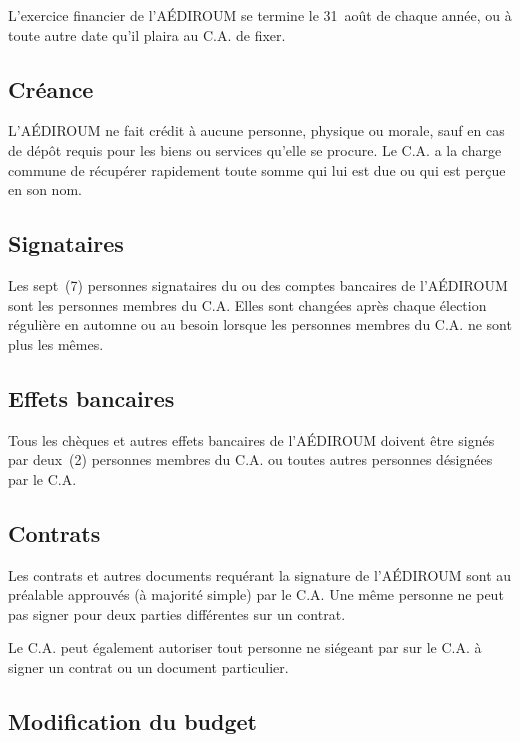 \documentclass{aediroum}
\begin{document}
L'exercice financier de l'AÉDIROUM se termine le 31~août de chaque année, ou à toute autre date qu'il plaira au C.A. de fixer.

\subsection{Créance}\label{sec:creance}

L'AÉDIROUM ne fait crédit à aucune personne, physique ou morale, sauf en cas de dépôt requis pour les biens ou services qu'elle se procure. Le C.A. a la charge commune de récupérer rapidement toute somme qui lui est due ou qui est perçue en son nom.

\subsection{Signataires}\label{sec:signataires}
Les sept~(7) personnes signataires du ou des comptes bancaires de l'AÉDIROUM sont les personnes membres du C.A. Elles sont changées après chaque élection régulière en automne ou au besoin lorsque les personnes membres du C.A. ne sont plus les mêmes.

\subsection{Effets bancaires}\label{sec:effets-bancaires}

Tous les chèques et autres effets bancaires de l'AÉDIROUM doivent être signés par deux~(2) personnes membres du C.A. ou toutes autres personnes désignées par le C.A.

\subsection{Contrats}\label{sec:contrats}

Les contrats et autres documents requérant la signature de l'AÉDIROUM sont au préalable approuvés (à majorité simple) par le C.A. Une même personne ne peut pas signer pour deux parties différentes sur un contrat.

Le C.A. peut également autoriser tout personne ne siégeant par sur le C.A. à signer un contrat ou un document particulier.

\subsection{Modification du budget}\label{sec:modification-budget}
\end{document}
